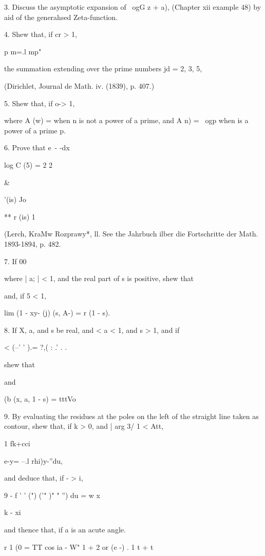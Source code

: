 {{3. Discuss the asymptotic expansion of \ ogG z + a), (Chapter xii
example 48) by aid of the generahsed Zeta-function. 

4. Shew that, if cr > 1,

p m=.l mp"

the summation extending over the prime numbers jd = 2, 3, 5,

(Dirichlet, Journal de Math. iv. (1839), p. 407.)

5. Shew that, if o-> 1,

where A (w) = when n is not a power of a prime, and A n) = \ ogp when
is a power of a prime p.

6. Prove that e~- -dx

log C (5) = 2 2

 \&

'(is) Jo

** r (is) 1

(Lerch, KraMw Rozprawy*, ll. See the Jahrbuch ilber die Fortschritte
der Math. 1893-1894, p. 482.

%
%

7. If 00

where | a; | < 1, and the real part of s is positive, shew that

and, if 5 < 1,

lim (1 - xy- (j) (s, A-) = r (1 - s).


8. If X, a, and s be real, and < a < 1, and s > 1, and if

< (--' ' ).= ?,( : .' . .

shew that

and

(b (x, a, 1 - s) = tttVo


9. By evaluating the residues at the poles on the left of the straight
line taken as contour, shew that, if k > 0, and | arg 3/ 1 < Att,

1 fk+cci

e-y= --.l rhi)y-''du,

and deduce that, if - > i,

9 - f ' ' (")  ('" )" " '') du = w x\

k - xi

and thence that, if a is an acute angle.

r 1 (0 = TT cos ia - W" 1 + 2 or (e -) . 1 t + t

}}
